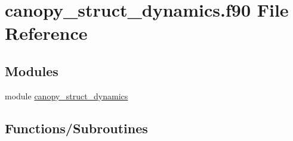 \hypertarget{canopy__struct__dynamics_8f90}{}\section{canopy\+\_\+struct\+\_\+dynamics.\+f90 File Reference}
\label{canopy__struct__dynamics_8f90}
\subsection*{Modules}
\begin{DoxyCompactItemize}
\item 
module \hyperlink{namespacecanopy__struct__dynamics}{canopy\+\_\+struct\+\_\+dynamics}
\end{DoxyCompactItemize}
\subsection*{Functions/\+Subroutines}
